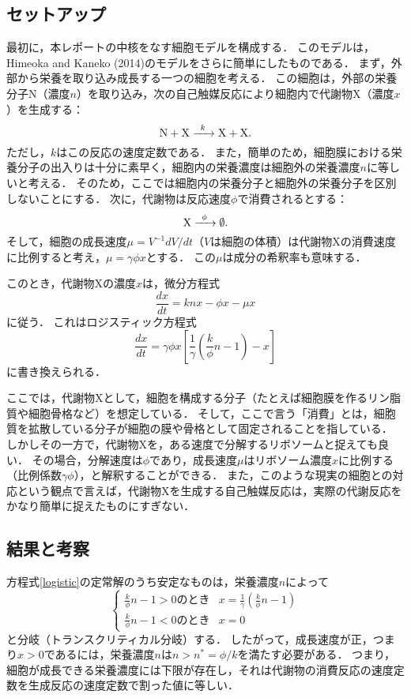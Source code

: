 \subsection{セットアップ}
最初に，本レポートの中核をなす細胞モデルを構成する．
このモデルは，Himeoka and Kaneko (2014)のモデル\cite{hk14}をさらに簡単にしたものである．
まず，外部から栄養を取り込み成長する一つの細胞を考える．
この細胞は，外部の栄養分子N（濃度$n$）を取り込み，次の自己触媒反応により細胞内で代謝物X（濃度$x$）を生成する：
\begin{equation}
  \ce{N + X ->[$k$] X + X}.
\end{equation}
ただし，$k$はこの反応の速度定数である．
また，簡単のため，細胞膜における栄養分子の出入りは十分に素早く，細胞内の栄養濃度は細胞外の栄養濃度$n$に等しいと考える．
そのため，ここでは細胞内の栄養分子と細胞外の栄養分子を区別しないことにする．
次に，代謝物は反応速度$\phi$で消費されるとする：
\begin{equation}
  \ce{X ->[$\phi$] $\emptyset$}.
\end{equation}
そして，細胞の成長速度$\mu=V^{-1}dV/dt$（$V$は細胞の体積）は代謝物Xの消費速度に比例すると考え，$\mu=\gamma \phi x$とする．
この$\mu$は成分の希釈率も意味する．

このとき，代謝物Xの濃度$x$は，微分方程式
\begin{equation}
  \frac{dx}{dt} = k n x - \phi x - \mu x
\end{equation}
に従う．
これはロジスティック方程式
\begin{equation}
  \frac{dx}{dt} = \gamma \phi x \left[\frac{1}{\gamma}\left(\frac{k}{\phi} n - 1\right) - x \right] \label{logistic}
\end{equation}
に書き換えられる．

ここでは，代謝物Xとして，細胞を構成する分子（たとえば細胞膜を作るリン脂質や細胞骨格など）を想定している．
そして，ここで言う「消費」とは，細胞質を拡散している分子が細胞の膜や骨格として固定されることを指している．
しかしその一方で，代謝物Xを，ある速度で分解するリボソームと捉えても良い．
その場合，分解速度は$\phi$であり，成長速度$\mu$はリボソーム濃度$x$に比例する（比例係数$\gamma\phi$），と解釈することができる．
また，このような現実の細胞との対応という観点で言えば，代謝物Xを生成する自己触媒反応は，実際の代謝反応をかなり簡単に捉えたものにすぎない．

\subsection{結果と考察}
方程式\eqref{logistic}の定常解のうち安定なものは，栄養濃度$n$によって
\begin{equation}
  \begin{cases}
    \frac{k}{\phi} n - 1 > 0 \text{のとき} & x = \frac{1}{\gamma} \left( \frac{k}{\phi} n - 1 \right) \\
    \frac{k}{\phi} n - 1 < 0 \text{のとき} & x = 0
  \end{cases}
\end{equation}
と分岐（トランスクリティカル分岐）する．
したがって，成長速度が正，つまり$x > 0$であるには，栄養濃度$n$は$n > n^* = \phi/k$を満たす必要がある．
つまり，細胞が成長できる栄養濃度には下限が存在し，それは代謝物の消費反応の速度定数を生成反応の速度定数で割った値に等しい．

